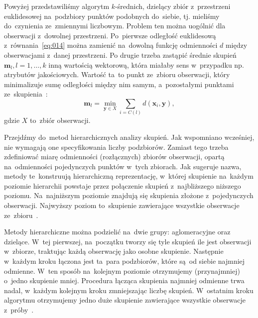 \documentclass{praca1}
\begin{document}
Powyżej przedstawiliśmy algorytm $k$-średnich, dzielący zbiór z~przestrzeni euklidesowej na~podzbiory punktów podobnych do~siebie, tj. mieliśmy do~czynienia ze~zmiennymi liczbowym. Problem ten można uogólnić dla obserwacji z~dowolnej przestrzeni. Po~pierwsze odległość euklidesową z~równania~\eqref{eq:014} można zamienić na~dowolną funkcję odmienności $d$ między obserwacjami z~danej przestrzeni. %
%
%
Po drugie trzeba zastąpić średnie skupień $\mathbf{m}_l, l=1,\ldots,k$ inną wartością wektorową, która miałaby sens w~przypadku np. atrybutów jakościowych. Wartość ta~to punkt ze~zbioru obserwacji, który minimalizuje sumę odległości między nim samym, a~pozostałymi punktami ze~skupienia~\cite{Koronacki2005:statystyczne}:
\begin{equation}
\mathbf{m}_l = \min\limits_{\mathbf{y} \in X} \sum\limits_{i = C(l)} d(\mathbf{x}_i, \mathbf{y}),
\end{equation}
gdzie $X$ to~zbiór obserwacji.

Przejdźmy do~metod hierarchicznych analizy skupień. Jak wspomniano wcześniej, nie wymagają one specyfikowania liczby podzbiorów. Zamiast tego trzeba zdefiniować miarę odmienności (rozłącznych) zbiorów obserwacji, opartą na~odmienności pojedynczych punktów w~tych zbiorach. Jak sugeruje nazwa, metody te~konstruują hierarchiczną reprezentację, w~której skupienie na~każdym poziomie hierarchii powstaje przez połączenie skupień z~najbliższego niższego poziomu. Na~najniższym poziomie znajdują się skupienia złożone z~pojedynczych obserwacji. Najwyższy poziom to~skupienie zawierające wszystkie obserwacje ze~zbioru~\cite{Hastie2009:elements}.

Metody hierarchiczne można podzielić na~dwie grupy: aglomeracyjne oraz dzielące. W~tej pierwszej, na~początku tworzy się tyle skupień ile jest obserwacji w~zbiorze, traktując każdą obserwację jako osobne skupienie. Następnie w~każdym kroku łączona jest ta~para podzbiorów, które są~od siebie najmniej odmienne. W~ten sposób na~kolejnym poziomie otrzymujemy (przynajmniej) o~jedno skupienie mniej. Procedura łącząca skupienia najmniej odmienne trwa nadal, w~każdym kolejnym kroku zmniejszając liczbę skupień. W~ostatnim kroku algorytmu otrzymujemy jedno duże skupienie zawierające wszystkie obserwacje z~próby~\cite{Hastie2009:elements, Koronacki2005:statystyczne}.
\end{document}
